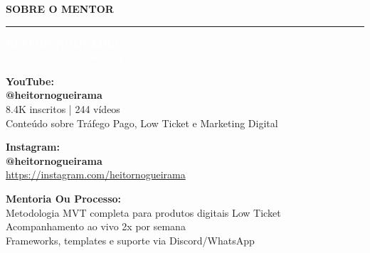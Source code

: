 \documentclass[12pt, a4paper]{article}
\begin{document}
\begin{center}
    {\Huge \textcolor{primaryColor}{\textbf{SOBRE O MENTOR}}} \\
    \vspace{1cm}
    \rule{12cm}{1.5pt}
    \vspace{1cm}

    \colorbox{accentColor}{%
        \parbox{0.92\textwidth}{%
            \centering
            \vspace{0.8cm}
            \textcolor{white}{\Huge \textbf{HEITOR NOGUEIRA}} \\
            \vspace{0.3cm}
            \textcolor{white}{\Large Especialista em Growth Marketing \& Tráfego Pago} \\
            \vspace{0.8cm}
        }%
    }

    \vspace{1cm}

    \begin{flushleft}
    \large
    \textbf{YouTube:} \\
    \vspace{0.3cm}
    \hspace{1cm} \textcolor{accentColor}{\Large \textbf{@heitornogueirama}} \\
    \hspace{1cm} \textcolor{secondaryText}{8.4K inscritos | 244 vídeos} \\
    \hspace{1cm} \textcolor{secondaryText}{Conteúdo sobre Tráfego Pago, Low Ticket e Marketing Digital} \\

    \vspace{1cm}

    \textbf{Instagram:} \\
    \vspace{0.3cm}
    \hspace{1cm} \textcolor{accentColor}{\Large \textbf{@heitornogueirama}} \\
    \hspace{1cm} \textcolor{secondaryText}{\url{https://instagram.com/heitornogueirama}} \\

    \vspace{1cm}

    \textbf{Mentoria Ou Processo:} \\
    \vspace{0.3cm}
    \hspace{1cm} \textcolor{secondaryText}{Metodologia MVT completa para produtos digitais Low Ticket} \\
    \hspace{1cm} \textcolor{secondaryText}{Acompanhamento ao vivo 2x por semana} \\
    \hspace{1cm} \textcolor{secondaryText}{Frameworks, templates e suporte via Discord/WhatsApp} \\
    \end{flushleft}


\end{center}
\end{document}
